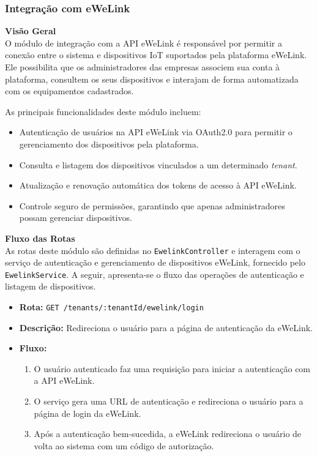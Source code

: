\subsubsection{Integração com eWeLink}\label{subsubsec:integacao_ewelink}

\textbf{Visão Geral}\\

O módulo de integração com a API eWeLink é responsável por permitir a conexão entre o sistema e dispositivos IoT suportados pela plataforma eWeLink. Ele possibilita que os administradores das empresas associem sua conta à plataforma, consultem os seus dispositivos e interajam de forma automatizada com os equipamentos cadastrados.

As principais funcionalidades deste módulo incluem:

\begin{itemize}
    \item Autenticação de usuários na API eWeLink via OAuth2.0 para permitir o gerenciamento dos dispositivos pela plataforma.
    \item Consulta e listagem dos dispositivos vinculados a um determinado \textit{tenant}.
    \item Atualização e renovação automática dos tokens de acesso à API eWeLink.
    \item Controle seguro de permissões, garantindo que apenas administradores possam gerenciar dispositivos.
\end{itemize}

\textbf{Fluxo das Rotas}\\

As rotas deste módulo são definidas no \texttt{EwelinkController} e interagem com o serviço de autenticação e gerenciamento de dispositivos eWeLink, fornecido pelo \texttt{EwelinkService}. A seguir, apresenta-se o fluxo das operações de autenticação e listagem de dispositivos.

\begin{itemize}
    \item \textbf{Rota:} \texttt{GET /tenants/:tenantId/ewelink/login}
    \item \textbf{Descrição:} Redireciona o usuário para a página de autenticação da eWeLink.
    \item \textbf{Fluxo:}
    \begin{enumerate}
        \item O usuário autenticado faz uma requisição para iniciar a autenticação com a API eWeLink.
        \item O serviço gera uma URL de autenticação e redireciona o usuário para a página de login da eWeLink.
        \item Após a autenticação bem-sucedida, a eWeLink redireciona o usuário de volta ao sistema com um código de autorização.
    \end{enumerate}
\end{itemize}

